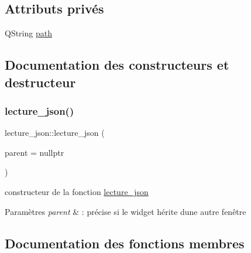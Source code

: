\subsection*{Attributs privés}
\begin{DoxyCompactItemize}
\item 
Q\+String \hyperlink{classlecture__json_addfbc41d56e266180e4a120ba3cd1c61}{path}
\end{DoxyCompactItemize}


\subsection{Documentation des constructeurs et destructeur}
\mbox{\label{classlecture__json_a4b8226b61ad6f1112038dde13e207b4f}} 
\subsubsection{\texorpdfstring{lecture\+\_\+json()}{lecture\_json()}}
{\footnotesize\ttfamily lecture\+\_\+json\+::lecture\+\_\+json (\begin{DoxyParamCaption}\item[{Q\+Object $\ast$}]{parent = {\ttfamily nullptr} }\end{DoxyParamCaption})\hspace{0.3cm}{\ttfamily [explicit]}}



constructeur de la fonction \hyperlink{classlecture__json}{lecture\+\_\+json} 


\begin{DoxyParams}{Paramètres}
{\em parent} & \+: précise si le widget hérite d\textquotesingle{}une autre fenêtre \\
\hline
\end{DoxyParams}


\subsection{Documentation des fonctions membres}
\mbox{\label{classlecture__json_a62f7f4bea2c9579c37bea5b14177a5db}} 
